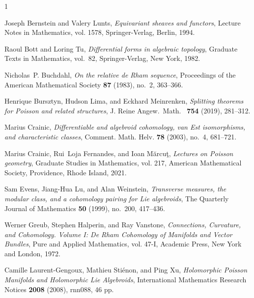 \documentclass[11pt]{amsart}
\theoremstyle{definition}
\theoremstyle{remark}
\begin{document}
 
\def\cprime{$'$} \def\polhk#1{\setbox0=\hbox{#1}{\ooalign{\hidewidth
			\lower1.5ex\hbox{`}\hidewidth\crcr\unhbox0}}} \def\cprime{$'$}
\def\cprime{$'$} \def\cprime{$'$} \def\cprime{$'$} \def\cprime{$'$}
\def\polhk#1{\setbox0=\hbox{#1}{\ooalign{\hidewidth
			\lower1.5ex\hbox{`}\hidewidth\crcr\unhbox0}}} \def\cprime{$'$}
\def\cprime{$'$} \def\cprime{$'$} \def\cprime{$'$} \def\cprime{$'$}
\providecommand{\bysame}{\leavevmode\hbox to3em{\hrulefill}\thinspace}
\providecommand{\MR}{\relax\ifhmode\unskip\space\fi MR }
\providecommand{\MRhref}[2]{%
	\href{http://www.ams.org/mathscinet-getitem?mr=#1}{#2}
}
\providecommand{\href}[2]{#2}
\begin{thebibliography}{1}
	
	Joseph Bernstein and Valery Lunts, \emph{Equivariant sheaves and functors},
	Lecture Notes in Mathematics, vol. 1578, Springer-Verlag, Berlin, 1994.
	
	Raoul Bott and Loring Tu, \emph{Differential forms in algebraic topology},
	Graduate Texts in Mathematics, vol.~82, Springer-Verlag, New York, 1982.
	
	Nicholas~P. Buchdahl, \emph{{On the relative de Rham sequence}}, Proceedings of
	the American Mathematical Society \textbf{87} (1983), no.~2, 363--366.
	
	Henrique Bursztyn, Hudson Lima, and Eckhard Meinrenken, \emph{{Splitting
			theorems for Poisson and related structures}}, J. Reine Angew.~Math.~
	\textbf{754} (2019), 281--312.
	
	Marius Crainic, \emph{Differentiable and algebroid cohomology, van {E}st
		isomorphisms, and characteristic classes}, Comment. Math. Helv. \textbf{78}
	(2003), no.~4, 681--721.
	
	Marius Crainic, Rui~Loja Fernandes, and Ioan M{\u{a}}rcu{\c{t}}, \emph{Lectures
		on {P}oisson geometry}, Graduate Studies in Mathematics, vol. 217, American
	Mathematical Society, Providence, Rhode Island, 2021.
	
	Sam Evens, Jiang-Hua Lu, and Alan Weinstein, \emph{{Transverse measures, the
			modular class, and a cohomology pairing for Lie algebroids}}, The Quarterly
	Journal of Mathematics \textbf{50} (1999), no.~200, 417--436.
	
	Werner Greub, Stephen Halperin, and Ray Vanstone, \emph{{Connections,
			Curvature, and Cohomology. Volume I: De Rham Cohomology of Manifolds and
			Vector Bundles}}, Pure and Applied Mathematics, vol. 47-I, Academic Press,
	New York and London, 1972.
	
	Camille Laurent-Gengoux, Mathieu Sti\'{e}non, and Ping Xu, \emph{{Holomorphic
			Poisson Manifolds and Holomorphic Lie Algebroids}}, International Mathematics
	Research Notices \textbf{2008} (2008), rnn088, 46 pp.
	
\end{thebibliography}
\end{document}
